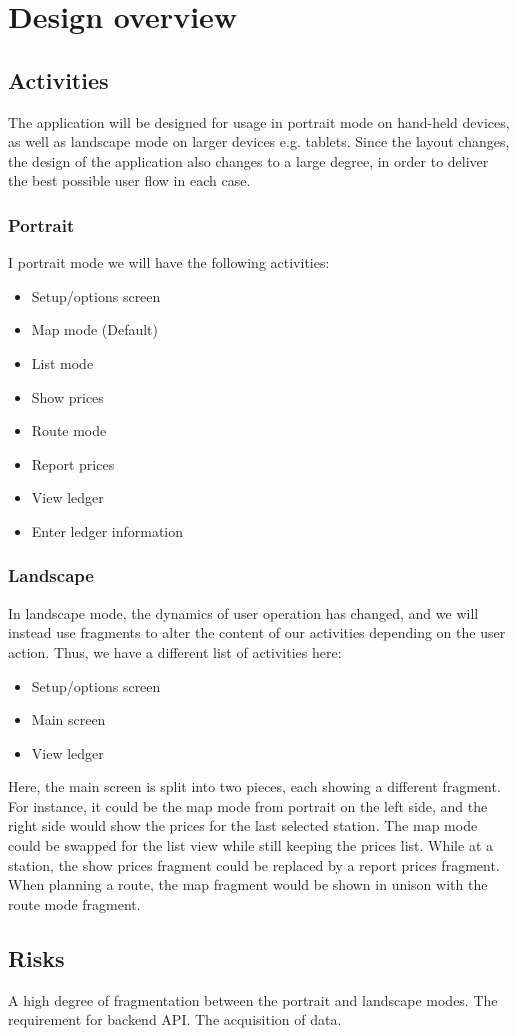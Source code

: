 
\chapter{Design overview}


\section{Activities}
The application will be designed for usage in portrait mode on hand-held devices, as well as landscape mode on larger devices e.g. tablets. Since the layout changes, the design of the application also changes to a large degree, in order to deliver the best possible user flow in each case.

\subsection{Portrait}
I portrait mode we will have the following activities:
\begin{itemize}
	\item Setup/options screen
	\item Map mode (Default)
	\item List mode
	\item Show prices
	\item Route mode
	\item Report prices
	\item View ledger
	\item Enter ledger information
\end{itemize}

\subsection{Landscape}
In landscape mode, the dynamics of user operation has changed, and we will instead use fragments to alter the content of our activities depending on the user action. Thus, we have a different list of activities here:
\begin{itemize}
	\item Setup/options screen
	\item Main screen
	\item View ledger
\end{itemize}

Here, the main screen is split into two pieces, each showing a different fragment. For instance, it could be the map mode from portrait on the left side, and the right side would show the prices for the last selected station. The map mode could be swapped for the list view while still keeping the prices list. While at a station, the show prices fragment could be replaced by a report prices fragment. When planning a route, the map fragment would be shown in unison with the route mode fragment.

\section{Risks}
A high degree of fragmentation between the portrait and landscape modes.
The requirement for backend API.
The acquisition of data.